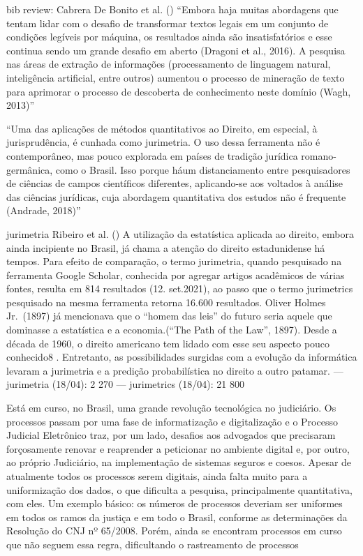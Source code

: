 \documentclass[
  12pt,
  letterpaper,
]{book}
\begin{document}
bib review: Cabrera De Bonito et al.
() ``Embora haja
muitas abordagens que tentam lidar com o desafio de transformar textos
legais em um conjunto de condições legíveis por máquina, os resultados
ainda são insatisfatórios e esse continua sendo um grande desafio em
aberto (Dragoni et al., 2016). A pesquisa nas áreas de extração de
informações (processamento de linguagem natural, inteligência
artificial, entre outros) aumentou o processo de mineração de texto para
aprimorar o processo de descoberta de conhecimento neste domínio (Wagh,
2013)''

``Uma das aplicações de métodos quantitativos ao Direito, em especial, à
jurisprudência, é cunhada como jurimetria. O uso dessa ferramenta não é
contemporâneo, mas pouco explorada em países de tradição jurídica
romano-germânica, como o Brasil. Isso porque háum distanciamento entre
pesquisadores de ciências de campos científicos diferentes, aplicando-se
aos voltados à análise das ciências jurídicas, cuja abordagem
quantitativa dos estudos não é frequente (Andrade, 2018)''

jurimetria Ribeiro et al. ()
A utilização da estatística aplicada ao direito, embora ainda incipiente
no Brasil, já chama a atenção do direito estadunidense há tempos. Para
efeito de comparação, o termo jurimetria, quando pesquisado na
ferramenta Google Scholar, conhecida por agregar artigos acadêmicos de
várias fontes, resulta em 814 resultados (12. set.2021), ao passo que o
termo jurimetrics pesquisado na mesma ferramenta retorna 16.600
resultados. Oliver Holmes Jr.~(1897) já mencionava que o ``homem das
leis'' do futuro seria aquele que dominasse a estatística e a
economia.(``The Path of the Law'', 1897). Desde a década de 1960, o
direito americano tem lidado com esse seu aspecto pouco conhecido8 .
Entretanto, as possibilidades surgidas com a evolução da informática
levaram a jurimetria e a predição probabilística no direito a outro
patamar. --- jurimetria (18/04): 2 270 --- jurimetrics (18/04): 21 800

Está em curso, no Brasil, uma grande revolução tecnológica no
judiciário. Os processos passam por uma fase de informatização e
digitalização e o Processo Judicial Eletrônico traz, por um lado,
desafios aos advogados que precisaram forçosamente renovar e reaprender
a peticionar no ambiente digital e, por outro, ao próprio Judiciário, na
implementação de sistemas seguros e coesos. Apesar de atualmente todos
os processos serem digitais, ainda falta muito para a uniformização dos
dados, o que dificulta a pesquisa, principalmente quantitativa, com
eles. Um exemplo básico: os números de processos deveriam ser uniformes
em todos os ramos da justiça e em todo o Brasil, conforme as
determinações da Resolução do CNJ nº 65/2008. Porém, ainda se encontram
processos em curso que não seguem essa regra, dificultando o
rastreamento de processos
\end{document}
